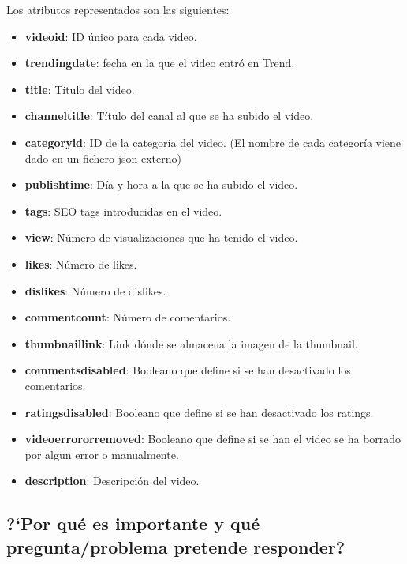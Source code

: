 \documentclass[a4paper,12pt]{article}
\begin{document}
Los atributos representados son las siguientes:

\begin{itemize}

\item \textbf{video{\textunderscore}id}: ID \'unico para cada video.
\item \textbf{trending{\textunderscore}date}: fecha en la que el video entr\'o en Trend.
\item \textbf{title}: T\'itulo del video.
\item \textbf{channel{\textunderscore}title}: T\'itulo del canal al que se ha subido el v\'ideo.
\item \textbf{category{\textunderscore}id}: ID de la categor\'ia del video. (El nombre de cada categor\'ia viene dado en un fichero json externo)
\item \textbf{publish{\textunderscore}time}: D\'ia y hora a la que se ha subido el video.
\item \textbf{tags}: SEO tags introducidas en el video.
\item \textbf{view}: N\'umero de visualizaciones que ha tenido el video.
\item \textbf{likes}: N\'umero de likes.
\item \textbf{dislikes}: N\'umero de dislikes.
\item \textbf{comment{\textunderscore}count}: N\'umero de comentarios.
\item \textbf{thumbnail{\textunderscore}link}: Link d\'onde se almacena la imagen de la thumbnail.
\item \textbf{comments{\textunderscore}disabled}: Booleano que define si se han desactivado los comentarios.
\item \textbf{ratings{\textunderscore}disabled}: Booleano que define si se han desactivado los ratings.
\item \textbf{video{\textunderscore}error{\textunderscore}or{\textunderscore}removed}: Booleano que define si se han el video se ha borrado por algun error o manualmente.
\item \textbf{description}: Descripci\'on del video.

\end{itemize}

\subsection[item_importancia]{?`Por qu\'e es importante y qu\'e  pregunta/problema pretende responder?}
\end{document}
